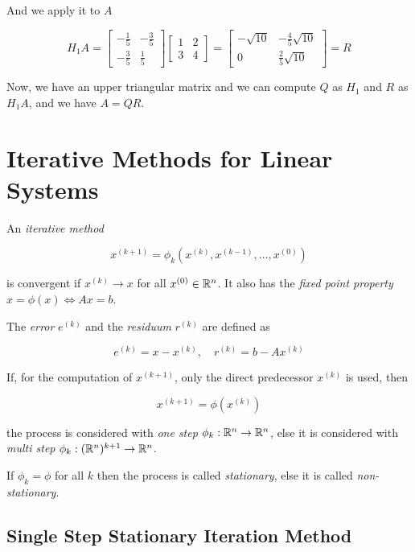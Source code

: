 And we apply it to \(A\)

\[
    H_1 A = 
    \begin{bmatrix}
        -\frac{1}{5} & -\frac{3}{5} \\ 
        -\frac{3}{5} & \frac{1}{5}
    \end{bmatrix}
    \begin{bmatrix}
        1 & 2 \\ 
        3 & 4
    \end{bmatrix}
    =
    \begin{bmatrix}
        -\sqrt{10} & -\frac{4}{5}\sqrt{10} \\ 
        0 & \frac{2}{5}\sqrt{10}
    \end{bmatrix}
    = R
\]

Now, we have an upper triangular matrix and we can compute \(Q\) as \(H_1\) and \(R\) as \(H_1 A\), and we have \(A = QR\).

\section{Iterative Methods for Linear Systems}

An \emph{iterative method} 

\[
    x^{(k + 1)} = \phi_k(x^{(k)}, x^{(k - 1)}, \dots, x^{(0)})
\]

is convergent if \(x^{(k)} \to x\) for all  \(x^{(0)} \in \mathbb{R}^n\). It also has the \emph{fixed point property} 
\(x = \phi(x) \iff Ax = b\).

The \emph{error} \(e^{(k)}\) and the \emph{residuum} \(r^{(k)}\) are defined as

\[
    e^{(k)} = x - x^{(k)}, \quad r^{(k)} = b - Ax^{(k)}
\]

If, for the computation of \(x^{(k + 1)}\), only the direct predecessor \(x^{(k)}\) is used, then

\[
    x^{(k + 1)} = \phi(x^{(k)})
\]

the process is considered with \emph{one step} \(\phi_k : \mathbb{R}^n \to \mathbb{R}^n\), else it is considered with \emph{multi step} 
\(\phi_k : (\mathbb{R}^n)^{k + 1} \to \mathbb{R}^n\).

If \(\phi_k = \phi\) for all \(k\) then the process is called \emph{stationary}, else it is called \emph{non-stationary}.

\subsection{Single Step Stationary Iteration Method}

